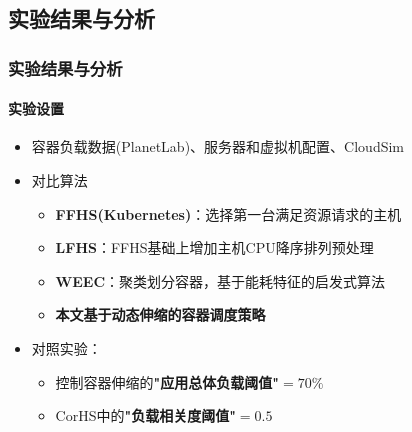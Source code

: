 \subsection{实验结果与分析}

\begin{frame}
\frametitle{实验结果与分析}
\framesubtitle{实验设置}
\begin{itemize}
    \item 容器负载数据(PlanetLab)、服务器和虚拟机配置、CloudSim
    \item 对比算法
    \begin{itemize}
        \item \textbf{FFHS(Kubernetes)}：选择第一台满足资源请求的主机
        \item \textbf{LFHS}：FFHS基础上增加主机CPU降序排列预处理
        \item \textbf{WEEC}：聚类划分容器，基于能耗特征的启发式算法
        \item \textbf{本文基于动态伸缩的容器调度策略}
    \end{itemize}
    \item 对照实验：
    \begin{itemize}
        \item 控制容器伸缩的\textbf{"应用总体负载阈值"$=70\%$}
        \item CorHS中的\textbf{"负载相关度阈值"$=0.5$}
    \end{itemize}
    \begin{table}[hftb]
        \centering
        \caption{实验对照组设置}
        \label{tab:tab5}
    \end{table}
\end{itemize}
\end{frame}

